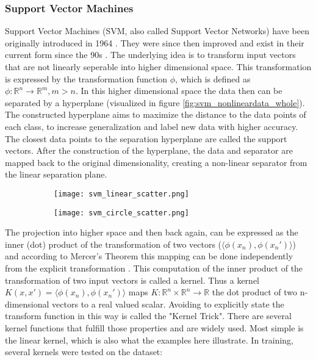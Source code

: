 \subsubsection{Support Vector Machines}
\FloatBarrier
Support Vector Machines (SVM, also called Support Vector Networks) have been originally introduced in 1964 \cite{Aizerman.1964}. They were since then improved and exist in their current form since the 90s \cite{Boser.1992, Cortes.1995}. The underlying idea is to transform input vectors that are not linearly seperable into higher dimensional space. This transformation is expressed by the transformation function $\phi$, which is defined as $\phi: \mathbb{R}^n \rightarrow \mathbb{R}^m, m>n$. In this higher dimensional space the data then can be separated by a hyperplane (visualized in figure \ref{fig:svm_nonlineardata_whole}). The constructed hyperplane aims to maximize the distance to the data points of each class, to increase generalization and label new data with higher accuracy. The closest data points to the separation hyperplane are called the support vectors. After the construction of the hyperplane, the data and separator are mapped back to the original dimensionality, creating a non-linear separator from the linear separation plane.\\
\begin{figure}[ht] %
    \centering
    \begin{subfigure}{.5\textwidth}
        \centering
        \texttt{[image: svm\_linear\_scatter.png]}
        \label{fig:svm_lineardata}
    \end{subfigure}%
    \begin{subfigure}{.5\textwidth}
        \centering
        \texttt{[image: svm\_circle\_scatter.png]}
        \label{fig:svm_nonlineardata}
    \end{subfigure}
\end{figure}
The projection into higher space and then back again, can be expressed as the inner (dot) product of the transformation of two vectors ($\langle\phi(x_n),\phi(x_n')\rangle$) and according to Mercer's Theorem this mapping can be done independently from the explicit transformation \cite{Jordan.2004}. This computation of the inner product of the transformation of two input vectors is called a kernel. Thus a kernel $K(x,x') = \langle\phi(x_n),\phi(x_n')\rangle$ maps $K: \mathbb{R}^n\times\mathbb{R}^n\rightarrow\mathbb{R}$ the dot product of two n-dimensional vectors to a real valued scalar. Avoiding to explicitly state the transform function in this way is called the "Kernel Trick"\cite{Theodoridis.2008}. There are several kernel functions that fulfill those properties and are widely used. Most simple is the linear kernel, which is also what the examples here illustrate. In training, several kernels were tested on the dataset:
